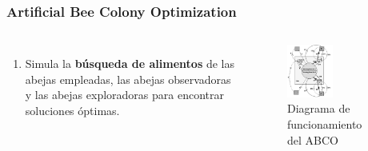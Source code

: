 \begin{frame}
  \frametitle{Artificial Bee Colony Optimization}
  \begin{columns}
    \begin{enumerate}
      \item Simula la \textbf{búsqueda de alimentos} de las abejas empleadas, las abejas observadoras y las abejas exploradoras para encontrar soluciones óptimas.
    \end{enumerate}
    \begin{figure}
      \begin{center}
        \includegraphics[width=0.5\textwidth]{imagenes/chapter3/abco.png}
      \end{center}
      \caption{Diagrama de funcionamiento del ABCO \footnotemark[9]}
    \end{figure}
  \end{columns}
\end{frame}


